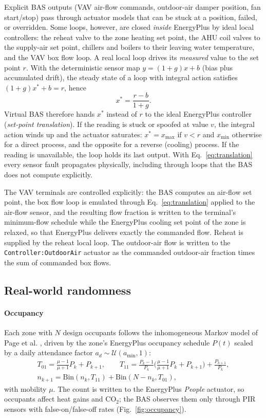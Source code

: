 \documentclass[preprint,12pt,authoryear=false]{elsarticle}
\begin{document}
Explicit BAS outputs (VAV air-flow commands, outdoor-air damper position, fan start/stop) pass through actuator models
that can be stuck at a position, failed, or overridden. Some loops, however, are closed \emph{inside} EnergyPlus by
ideal local controllers: the reheat valve to the zone heating set point, the AHU coil valves to the supply-air set
point, chillers and boilers to their leaving water temperature, and the VAV box flow loop. A real local loop drives its
\emph{measured} value to the set point $r$. With the deterministic sensor map $y=(1+g)x+b$ (bias plus accumulated
drift), the steady state of a loop with integral action satisfies $(1+g)x^*+b=r$, hence
\begin{equation}
x^* = \frac{r-b}{1+g}. \label{eq:translation}
\end{equation}
Virtual BAS therefore hands $x^*$ instead of $r$ to the ideal EnergyPlus controller (\emph{set-point translation}).
If the reading is stuck or spoofed at value $v$, the integral action winds up and the actuator saturates:
$x^*=x_{\max}$ if $v<r$ and $x_{\min}$ otherwise for a direct process, and the opposite for a reverse (cooling)
process. If the reading is unavailable, the loop holds its last output. With Eq.~\eqref{eq:translation} every sensor
fault propagates physically, including through loops that the BAS does not compute explicitly.

The VAV terminals are controlled explicitly: the BAS computes an air-flow set point, the box flow loop is emulated
through Eq.~\eqref{eq:translation} applied to the air-flow sensor, and the resulting flow fraction is written to the
terminal's minimum-flow schedule while the EnergyPlus cooling set point of the zone is relaxed, so that EnergyPlus
delivers exactly the commanded flow. Reheat is supplied by the reheat local loop. The outdoor-air flow is written to
the \texttt{Controller:OutdoorAir} actuator as the commanded outdoor-air fraction times the sum of commanded box flows.

\subsection{Real-world randomness}

\paragraph{Occupancy} Each zone with $N$ design occupants follows the inhomogeneous Markov model of Page et al.
\cite{page2008occupancy}, driven by the zone's EnergyPlus occupancy schedule $P(t)$ scaled by a daily attendance factor
$a_d\sim\mathcal{U}(a_{\min},1)$:
\begin{gather}
T_{01}=\tfrac{\mu-1}{\mu+1}P_k+P_{k+1},\qquad
T_{11}=\tfrac{P_k-1}{P_k}\Big(\tfrac{\mu-1}{\mu+1}P_k+P_{k+1}\Big)+\tfrac{P_{k+1}}{P_k},\\
n_{k+1}=\mathrm{Bin}(n_k,T_{11})+\mathrm{Bin}(N-n_k,T_{01}),
\end{gather}
with mobility $\mu$. The count is written to the EnergyPlus \emph{People} actuator, so occupants affect heat gains and
CO$_2$; the BAS observes them only through PIR sensors with false-on/false-off rates (Fig.~\ref{fig:occupancy}).
\end{document}

